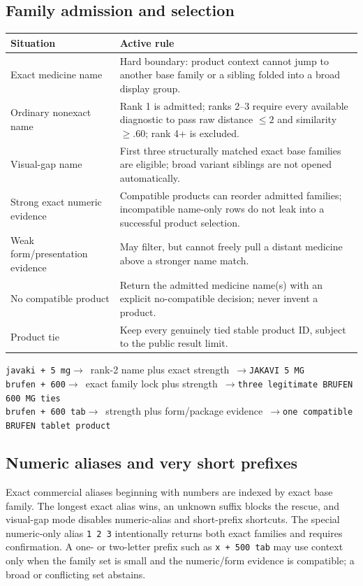 \documentclass[10pt,a4paper]{article}
\newcommand{\observed}[1]{\texttt{#1}}
\newcommand{\mapstoex}{\ensuremath{\longrightarrow}}
\newcommand{\caseflow}[3]{%
  \texttt{#1}\enspace\textcolor{Muted}{\mapstoex\ #2\ \mapstoex}\enspace\texttt{#3}}
\begin{document}
\subsection{Family admission and selection}

\begin{tabularx}{\textwidth}{@{}L{43mm}Y@{}}
\toprule
Situation & Active rule \\
\midrule
Exact medicine name & Hard boundary: product context cannot jump to another base family or a sibling folded into a broad display group. \\
Ordinary nonexact name & Rank 1 is admitted; ranks 2--3 require every available diagnostic to pass raw distance $\leq2$ and similarity $\geq.60$; rank 4+ is excluded. \\
Visual-gap name & First three structurally matched exact base families are eligible; broad variant siblings are not opened automatically. \\
Strong exact numeric evidence & Compatible products can reorder admitted families; incompatible name-only rows do not leak into a successful product selection. \\
Weak form/presentation evidence & May filter, but cannot freely pull a distant medicine above a stronger name match. \\
No compatible product & Return the admitted medicine name(s) with an explicit no-compatible decision; never invent a product. \\
Product tie & Keep every genuinely tied stable product ID, subject to the public result limit. \\
\bottomrule
\end{tabularx}

\begin{resultbox}[title=Three examples that define the intended behavior]
\caseflow{javaki + 5 mg}{rank-2 name plus exact strength}{JAKAVI 5 MG}\\
\caseflow{brufen + 600}{exact family lock plus strength}{three legitimate BRUFEN 600 MG ties}\\
\caseflow{brufen + 600 tab}{strength plus form/package evidence}{one compatible BRUFEN tablet product}
\end{resultbox}

\subsection{Numeric aliases and very short prefixes}

Exact commercial aliases beginning with numbers are indexed by exact base
family. The longest exact alias wins, an unknown suffix blocks the rescue, and
visual-gap mode disables numeric-alias and short-prefix shortcuts. The special
numeric-only alias \observed{1 2 3} intentionally returns both exact families
and requires confirmation. A one- or two-letter prefix such as
\observed{x + 500 tab} may use context only when the family set is small and
the numeric/form evidence is compatible; a broad or conflicting set abstains.
\end{document}
